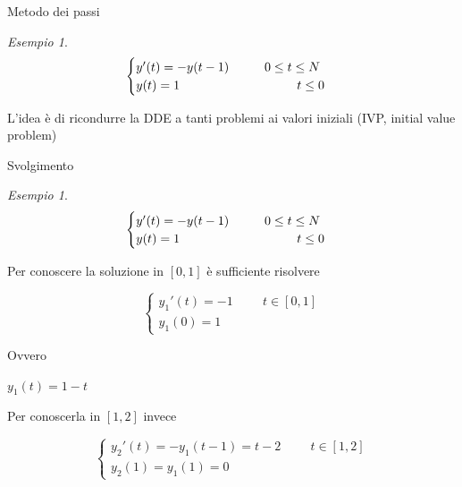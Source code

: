 \documentclass[intlimits]{beamer}
\numberwithin{equation}{section}
\theoremstyle{plain}
\theoremstyle{definition}
\theoremstyle{remark}
\newtheorem{esempio}[teor]{Esempio}
\begin{document}
\begin{frame}{Metodo dei passi}
\pause
\begin{esempio}
$$
\begin{cases}
 y'(t)=-y(t-1)	\hspace{1cm}		0 \le 	t \le N			\\
 y(t)=1		\hspace{3.3cm}			t \le 0
\end{cases}
$$
\end{esempio}
\pause
 
\vspace{1cm}

L'idea è di ricondurre la DDE a tanti problemi ai valori iniziali (IVP, initial value problem)

\end{frame}

\begin{frame}{Svolgimento}
\begin{esempio}
$$
\begin{cases}
 y'(t)=-y(t-1)	\hspace{1cm}		0 \le 	t \le N			\\
 y(t)=1		\hspace{3.3cm}			t \le 0
\end{cases}
$$
\end{esempio}
\pause
Per conoscere la soluzione in $[0,1]$ è sufficiente risolvere
\pause
\begin{block}{}
$$
\begin{cases}
 y_1'(t)=-1		 	\hspace{1cm}		t \in [0,1]	\\
 y_1(0)=1 
\end{cases}
$$
\end{block}


\pause
Ovvero

\begin{center}
 $y_1(t) = 1-t$
\end{center}

\pause
Per conoscerla in $[1 , 2]$ invece
\pause
\begin{block}{}
$$
\begin{cases}
 y_2'(t)=-y_1(t-1)= t-2		 	\hspace{1cm}		t \in [1,2]	\\
 y_2(1)=y_1(1)=0 
\end{cases}
$$
\end{block}



\end{frame}
\end{document}
